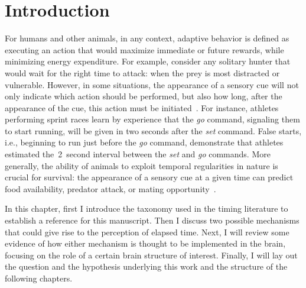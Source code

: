 \chapter{Introduction}
\label{ch:intro:intro}

For humans and other animals, in any context, adaptive behavior is defined as executing an action that would maximize immediate or future rewards, while minimizing energy expenditure.
For example, consider any solitary hunter that would wait for the right time to attack:
    when the prey is most distracted or vulnerable.
However, in some situations, the appearance of a sensory cue will not only indicate which action should be performed, but also how long, after the appearance of the cue, this action must be initiated~\cite{Balsam2009Map, Nobre2018NatRevNeurosci}.
For instance, athletes performing sprint races learn by experience that the \textit{go} command, signaling them to start running, will be given in two seconds after the \textit{set} command.
False starts, i.e., beginning to run just before the \textit{go} command, demonstrate that athletes estimated the~2~second interval between the \textit{set} and \textit{go} commands.
More generally, the ability of animals to exploit temporal regularities in nature is crucial for survival:
    the appearance of a sensory cue at a given time can predict food availability, predator attack, or mating opportunity~\cite{Kacelnik2002,Gallistel1990book}.
\par
In this chapter, first I introduce the taxonomy used in the timing literature to establish a reference for this manuscript.
Then I discuss two possible mechanisms that could give rise to the perception of elapsed time.
Next, I will review some evidence of how either mechanism is thought to be implemented in the brain, focusing on the role of a certain brain structure of interest.
Finally, I will lay out the question and the hypothesis underlying this work and the structure of the following chapters.





